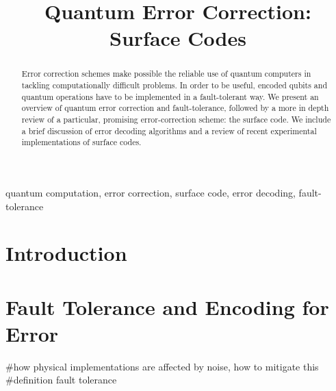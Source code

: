 \documentclass[conference]{IEEEtran}
\begin{document}
\title{Quantum Error Correction: Surface Codes}

\author{

  \and

}

\maketitle


\begin{abstract}
Error correction schemes make possible the reliable use of quantum computers in
tackling computationally difficult problems. In order to be useful, encoded
qubits and quantum operations have to be implemented in a fault-tolerant way. We
present an overview of quantum error correction and fault-tolerance, followed by
a more in depth review of a particular, promising error-correction scheme: the
surface code. We include a brief discussion of error decoding algorithms and a
review of recent experimental implementations of surface codes.
\end{abstract}

\begin{IEEEkeywords}
  quantum computation, error correction, surface code, error decoding, fault-tolerance
\end{IEEEkeywords}

\section{Introduction}


\section{Fault Tolerance and Encoding for Error}
#how physical implementations are affected by noise, how to mitigate this
#definition fault tolerance
\end{document}
